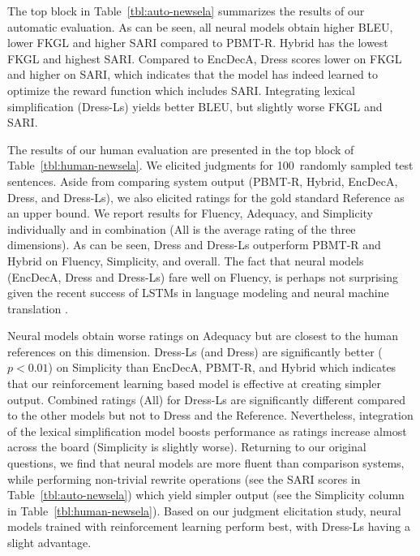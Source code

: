 \documentclass[11pt,letterpaper]{article}
\begin{document}
The top block in Table~\ref{tbl:auto-newsela} summarizes the results
of our automatic evaluation. As can be seen, all neural models obtain
higher BLEU, lower FKGL and higher SARI compared to PBMT-R. Hybrid has
the lowest FKGL and highest SARI.  Compared to EncDecA, {\sc Dress} scores
lower on FKGL and higher on SARI, which indicates that the model has
indeed learned to optimize the reward function which includes SARI.
Integrating lexical simplification ({\sc Dress-Ls}) yields better BLEU, but
slightly worse FKGL and SARI. 

The results of our human evaluation are presented in the top block of
Table~\ref{tbl:human-newsela}. We elicited judgments for 100~randomly
sampled test sentences. Aside from comparing system output (PBMT-R,
Hybrid, EncDecA, {\sc Dress}, and \mbox{{\sc Dress-Ls}}), we also elicited ratings
for the gold standard Reference as an upper bound.  We report results
for Fluency, Adequacy, and Simplicity individually and in combination
(All is the average rating of the three dimensions). 
As can be seen, {\sc Dress} and \mbox{{\sc Dress-Ls}} outperform \mbox{PBMT-R} and Hybrid on Fluency, Simplicity, and overall. The fact that neural
models (EncDecA, {\sc Dress} and \mbox{{\sc Dress-Ls}}) fare well on Fluency, is perhaps not surprising given the
recent success of LSTMs in language modeling and neural machine
translation \cite{zaremba:2014,jean2015montreal}. 

Neural models obtain worse ratings on Adequacy but are closest to the
human references on this dimension.  {\sc Dress-Ls} (and {\sc Dress}) are
significantly better ($p<0.01$) on Simplicity than EncDecA, PBMT-R,
and Hybrid which indicates that our reinforcement learning based model
is effective at creating simpler output. Combined ratings (All) for
{\sc Dress-Ls} are significantly different compared to the other models but
not to {\sc Dress} and the Reference. Nevertheless, integration of the
lexical simplification model boosts performance as ratings increase almost
across the board (Simplicity is slightly worse). Returning to our original questions, we find that
neural models are more fluent than comparison systems, while
performing non-trivial rewrite operations (see the SARI scores in
Table~\ref{tbl:auto-newsela}) which yield simpler output (see the
Simplicity column in Table~\ref{tbl:human-newsela}). Based on our
judgment elicitation study, neural models trained with reinforcement
learning perform best, with \mbox{{\sc Dress-Ls}} having a slight advantage.
\end{document}
